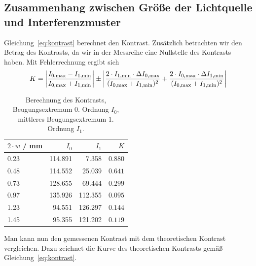 \documentclass{article}
\begin{document}
\subsection{Zusammenhang zwischen Größe der Lichtquelle und Interferenzmuster}

Gleichung~\eqref{eq:kontrast} berechnet den Kontrast. Zusätzlich betrachten wir den Betrag des Kontrasts, da wir in der Messreihe eine Nullstelle des Kontrasts haben. Mit Fehlerrechnung ergibt sich
\begin{align*}
K = \left|\frac{I_\text{0,max}-I_\text{1,min}}{I_\text{0,max}+I_\text{1,min}} \right| \pm \left| \frac{ 2\cdot I_{1,\text{min}} \cdot \Delta I_{0,\text{max}} }{(I_\text{0,max}+I_\text{1,\text{min}})^2}  + \frac{ 2\cdot I_{0,\text{max}} \cdot \Delta I_{1,\text{min}} }{(I_\text{0,max}+I_\text{1,min})^2} \right|
\end{align*}



\begin{table}[H]
\caption{Berechnung des Kontrasts, Beugungsextremum 0. Ordnung $I_0$, mittleres Beugungsextremum 1. Ordnung $I_1$.}
\begin{tabular}{l|rr|r}
$2\cdot w$ / mm & $I_0$ & $I_1$ & $K$ \\
\hline
0.23 & 114.891 &   7.358 & $0.880$ \\
0.48 & 114.552 &  25.039 & $0.641$ \\
0.73 & 128.655 &  69.444 & $0.299$ \\
0.97 & 135.926 & 112.355 & $0.095$ \\
1.23 & 94.551  & 126.297 & $0.144$ \\
1.45 & 95.355 &  121.202 & $0.119$
\end{tabular}
\end{table}

Man kann nun den gemessenen Kontrast mit dem theoretischen Kontrast vergleichen. Dazu zeichnet die Kurve des theoretischen Kontrasts gemäß Gleichung~\eqref{eq:kontrast}.
\end{document}
